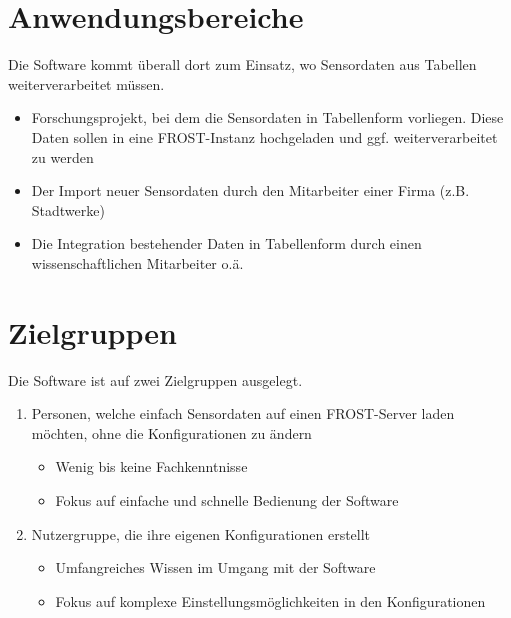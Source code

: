\documentclass[a4paper, 12 pt]{article}
\begin{document}
\pagebreak
\section{Anwendungsbereiche}
Die Software kommt überall dort zum Einsatz, wo Sensordaten aus Tabellen weiterverarbeitet müssen. \\
\begin{itemize}
	\item Forschungsprojekt, bei dem die Sensordaten in Tabellenform vorliegen. Diese Daten sollen in eine FROST-Instanz hochgeladen und ggf. weiterverarbeitet zu werden
	\item Der Import neuer Sensordaten durch den Mitarbeiter einer Firma (z.B. Stadtwerke)
	\item Die Integration bestehender Daten in Tabellenform durch einen wissenschaftlichen Mitarbeiter o.ä.
\end{itemize}





	
	\section{Zielgruppen}
	Die Software ist auf zwei Zielgruppen ausgelegt.\\
	\begin{enumerate}
		\item Personen, welche einfach Sensordaten auf einen FROST-Server laden möchten, ohne die Konfigurationen zu ändern
		
		\begin{itemize}
			\item Wenig bis keine Fachkenntnisse
			\item Fokus auf einfache und schnelle Bedienung der Software
		\end{itemize}
		
		\item Nutzergruppe, die ihre eigenen Konfigurationen erstellt
		\begin{itemize}
			\item Umfangreiches Wissen im Umgang mit der Software
			\item Fokus auf komplexe Einstellungsmöglichkeiten in den Konfigurationen
		\end{itemize} 
	\end{enumerate}
	
\end{document}
